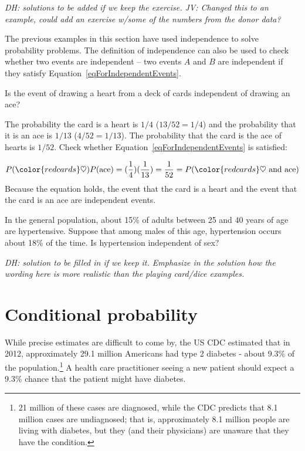 \textit{DH: solutions to be added if we keep the exercise. JV: Changed this to an example, could add an exercise w/some of the numbers from the donor data? }

The previous examples in this section have used independence to solve probability problems. The definition of independence can also be used to check whether two events are independent -- two events $A$ and $B$ are independent if they satisfy Equation~\eqref{eqForIndependentEvents}.

\begin{example}{Is the event of drawing a heart from a deck of cards independent of drawing an ace?}

The probability the card is a heart is $1/4$ ($13/52=1/4$) and the probability that it is an ace is $1/13$ ($4/52=1/13$). The probability that the card is the ace of hearts is $1/52$. Check whether Equation~\ref{eqForIndependentEvents} is satisfied:

\begin{align*}
P({\color{redcards}\heartsuit}) P(\text{ace}) = (\frac{1}{4}) (\frac{1}{13}) = \frac{1}{52} 
= P({\color{redcards}\heartsuit}\text{ and ace})
\end{align*}
Because the equation holds, the event that the card is a heart and the event that the card is an ace are independent events.
	
\end{example}

\begin{example}
 {In the general population, about 15\% of adults between 25 and 40  years of age are hypertensive.  Suppose that among males of this age, hypertension occurs about 18\% of the time.  Is hypertension independent of sex?} 

 \textit{DH: solution to be filled in if we keep it.  Emphasize in the solution how the wording here is more realistic than the playing card/dice examples.}
\end{example}



\section{Conditional probability}
\label{conditionalProbabilitySection}

While precise estimates are difficult to come by, the US CDC estimated that in 2012, approximately 29.1 million Americans had type 2 diabetes - about 9.3\% of the population.\footnote{21 million of these cases are diagnosed, while the CDC predicts that 8.1 million cases are undiagnosed; that is, approximately 8.1 million people are living with diabetes, but they (and their physicians) are unaware that they have the condition.} A health care practitioner seeing a new patient should expect a 9.3\% chance that the patient might have diabetes. 

